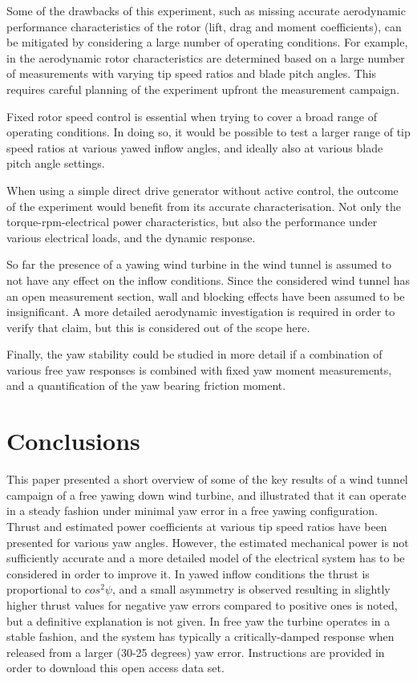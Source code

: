\documentclass[a4paper]{jpconf}
\begin{document}
Some of the drawbacks of this experiment, such as missing accurate aerodynamic performance characteristics of the rotor (lift, drag and moment coefficients), can be mitigated by considering a large number of operating conditions. For example, in \cite{bottasso_calibration_2014} the aerodynamic rotor characteristics are determined based on a large number of measurements with varying tip speed ratios and blade pitch angles. This requires careful planning of the experiment upfront the measurement campaign. 

Fixed rotor speed control is essential when trying to cover a broad range of operating conditions. In doing so, it would be possible to test a larger range of tip speed ratios at various yawed inflow angles, and ideally also at various blade pitch angle settings.

When using a simple direct drive generator without active control, the outcome of the experiment would benefit from its accurate characterisation. Not only the torque-rpm-electrical power characteristics, but also the performance under various electrical loads, and the dynamic response.

So far the presence of a yawing wind turbine in the wind tunnel is assumed to not have any effect on the inflow conditions. Since the considered wind tunnel has an open measurement section, wall and blocking effects have been assumed to be insignificant. A more detailed aerodynamic investigation is required in order to verify that claim, but this is considered out of the scope here. %

Finally, the yaw stability could be studied in more detail if a combination of various free yaw responses is combined with fixed yaw moment measurements, and a quantification of the yaw bearing friction moment.

\section{Conclusions}

This paper presented a short overview of some of the key results of a wind tunnel campaign of a free yawing down wind turbine, and illustrated that it can operate in a steady fashion under minimal yaw error in a free yawing configuration. Thrust and estimated power coefficients at various tip speed ratios have been presented for various yaw angles. However, the estimated mechanical power is not sufficiently accurate and a more detailed model of the electrical system has to be considered in order to improve it. In yawed inflow conditions the thrust is proportional to $cos^2 \psi$, and a small asymmetry is observed resulting in slightly higher thrust values for negative yaw errors compared to positive ones is noted, but a definitive explanation is not given. In free yaw the turbine operates in a stable fashion, and the system has typically a critically-damped response when released from a larger (30-25 degrees) yaw error. Instructions are provided in order to download this open access data set.
\end{document}
